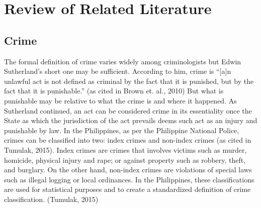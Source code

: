 
\chapter{Review of Related Literature}  %

\section{Crime} %
The formal definition of crime varies widely among criminologists but Edwin Sutherland’s short one may be sufficient. According to him, crime is “[a]n unlawful act is not defined as criminal by the fact that it is punished, but by the fact that it is punishable.” (as cited in Brown et. al., 2010) But what is punishable may be relative to what the crime is and where it happened. As Sutherland continued, an act can be considered crime in its essentiality once the State as which the jurisdiction of the act prevails deems such act as an injury and punishable by law.
In the Philippines, as per the Philippine National Police, crimes can be classified into two: index crimes and non-index crimes (as cited in Tumulak, 2015). Index crimes are crimes that involves victims such as murder, homicide, physical injury and rape; or against property such as robbery, theft, and burglary. On the other hand, non-index crimes are violations of special laws such as illegal logging or local ordinances. In the Philippines, these classifications are used for statistical purposes and to create a standardized definition of crime classification. (Tumulak, 2015)
